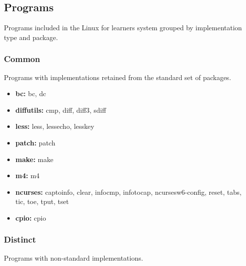 \subsection{Programs}\label{Programs}

Programs included in the Linux for learners system grouped by implementation type and package.

\subsubsection{Common}

Programs with implementations retained from the standard set of packages.

\begin{itemize}
    \item \textbf{bc:} bc, dc
    \item \textbf{diffutils:} cmp, diff, diff3, sdiff
    \item \textbf{less:} less, lessecho, lesskey
    \item \textbf{patch:} patch
    \item \textbf{make:} make
    \item \textbf{m4:} m4
    \item \textbf{ncurses:} captoinfo, clear, infocmp, infotocap, ncursesw6-config, reset, tabs, tic, toe, tput, tset
    \item \textbf{cpio:} cpio
\end{itemize}


\subsubsection{Distinct}

Programs with non-standard implementations.

